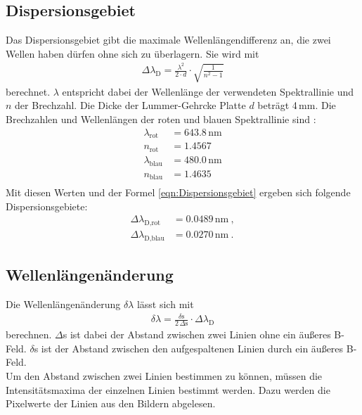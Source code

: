 \subsection{Dispersionsgebiet}
Das Dispersionsgebiet gibt die maximale Wellenlängendifferenz an, die zwei Wellen haben dürfen ohne sich zu überlagern. Sie wird mit
\begin{align}
  \Delta\lambda_\text{D} = \frac{\lambda^2}{2\cdot d} \cdot \sqrt{\frac{1}{n^2 - 1}}
  \label{eqn:Dispersionsgebiet}
\end{align}
berechnet. $\lambda$ entspricht dabei der Wellenlänge der verwendeten Spektrallinie und $n$ der Brechzahl. Die Dicke der Lummer-Gehrcke Platte $d$ beträgt 4\,mm. Die Brechzahlen und Wellenlängen der roten und blauen Spektrallinie sind \cite{V27}:
\begin{align*}
  \lambda_\text{rot} &= 643.8\,\text{nm} \\
  n_\text{rot} &= 1.4567 \\
  \lambda_\text{blau} &= 480.0\,\text{nm} \\
  n_\text{blau} &= 1.4635 \\
\end{align*}
Mit diesen Werten und der Formel \eqref{eqn:Dispersionsgebiet} ergeben sich folgende Dispersionsgebiete:
\begin{align*}
  \Delta\lambda_\text{D,rot} &= 0.0489\,\text{nm}\ , \\
  \Delta\lambda_\text{D,blau} &= 0.0270\,\text{nm}\ .
\end{align*}

\subsection{Wellenlängenänderung}
Die Wellenlängenänderung $\delta\lambda$ lässt sich mit
\begin{align}
  \delta\lambda = \frac{\delta\text{s}}{2\,\Delta\text{s}}\cdot \Delta\lambda_\text{D}
  \label{eqn:Verschiebung}
\end{align}
berechnen. $\Delta$s ist dabei der Abstand zwischen zwei Linien ohne ein äußeres B-Feld. $\delta$s ist der Abstand zwischen den aufgespaltenen Linien durch ein äußeres B-Feld. \\
Um den Abstand zwischen zwei Linien bestimmen zu können, müssen die Intensitätsmaxima der einzelnen Linien bestimmt werden. Dazu werden die Pixelwerte der Linien aus den Bildern abgelesen.



